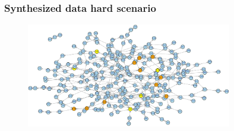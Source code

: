 \documentclass{beamer}
\begin{document}
\begin{frame}[plain]
  \frametitle{Synthesized data hard scenario}
  \begin{figure}
    \includegraphics[width=0.8\textwidth]{synthesized-hard}
  \end{figure}
\end{frame}
\end{document}
